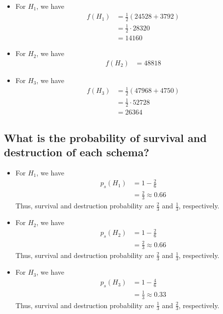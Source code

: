 \begin{itemize}
    \item For \(H_1\), we have
        \[
        \begin{aligned}
            f(H_1) &= \frac{1}{2}(24528 + 3792) \\
                   &= \frac{1}{2} \cdot 28320 \\
                   &= 14160
        \end{aligned}
        \]
    \item For \(H_2\), we have
        \[
        \begin{aligned}
            f(H_2) &= 48818
        \end{aligned}
        \]
    \item For \(H_3\), we have
        \[
        \begin{aligned}
            f(H_3) &= \frac{1}{2}(47968 + 4750) \\
                   &= \frac{1}{2} \cdot 52728 \\
                   &= 26364
        \end{aligned}
        \]
\end{itemize}

\subsection{What is the probability of survival and destruction of each schema?}

\begin{itemize}
    \item For \(H_1\), we have
        \[
        \begin{aligned}
            p_s(H_1) &= 1 - \frac{2}{6} \\
                     &= \frac{2}{3} \approx 0.66
        \end{aligned}
        \]
        Thus, survival and destruction probability are \(\frac23\) and \(\frac13\), respectively.
    \item For \(H_2\), we have
        \[
        \begin{aligned}
            p_s(H_2) &= 1 - \frac{2}{6} \\
                     &= \frac{2}{3} \approx 0.66
        \end{aligned}
        \]
        Thus, survival and destruction probability are \(\frac23\) and \(\frac13\), respectively.
    \item For \(H_3\), we have
        \[
        \begin{aligned}
            p_s(H_3) &= 1 - \frac{4}{6} \\
                     &= \frac{1}{3} \approx 0.33
        \end{aligned}
        \]
        Thus, survival and destruction probability are \(\frac13\) and \(\frac23\), respectively.
\end{itemize}
